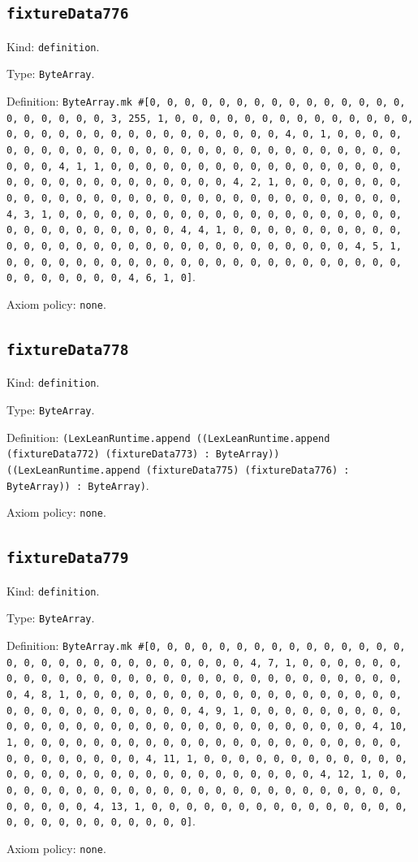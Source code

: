 \documentclass[11pt]{article}
\begin{document}
\subsection*{\texttt{fixtureData776}}
\noindent Kind: \texttt{definition}.\par
\noindent Type: \texttt{ByteArray}.\par
\noindent Definition: \texttt{ByteArray.mk \#[0, 0, 0, 0, 0, 0, 0, 0, 0, 0, 0, 0, 0, 0, 0, 0, 0, 0, 0, 0, 0, 3, 255, 1, 0, 0, 0, 0, 0, 0, 0, 0, 0, 0, 0, 0, 0, 0, 0, 0, 0, 0, 0, 0, 0, 0, 0, 0, 0, 0, 0, 0, 0, 0, 4, 0, 1, 0, 0, 0, 0, 0, 0, 0, 0, 0, 0, 0, 0, 0, 0, 0, 0, 0, 0, 0, 0, 0, 0, 0, 0, 0, 0, 0, 0, 0, 0, 4, 1, 1, 0, 0, 0, 0, 0, 0, 0, 0, 0, 0, 0, 0, 0, 0, 0, 0, 0, 0, 0, 0, 0, 0, 0, 0, 0, 0, 0, 0, 0, 0, 4, 2, 1, 0, 0, 0, 0, 0, 0, 0, 0, 0, 0, 0, 0, 0, 0, 0, 0, 0, 0, 0, 0, 0, 0, 0, 0, 0, 0, 0, 0, 0, 0, 4, 3, 1, 0, 0, 0, 0, 0, 0, 0, 0, 0, 0, 0, 0, 0, 0, 0, 0, 0, 0, 0, 0, 0, 0, 0, 0, 0, 0, 0, 0, 0, 0, 4, 4, 1, 0, 0, 0, 0, 0, 0, 0, 0, 0, 0, 0, 0, 0, 0, 0, 0, 0, 0, 0, 0, 0, 0, 0, 0, 0, 0, 0, 0, 0, 0, 4, 5, 1, 0, 0, 0, 0, 0, 0, 0, 0, 0, 0, 0, 0, 0, 0, 0, 0, 0, 0, 0, 0, 0, 0, 0, 0, 0, 0, 0, 0, 0, 0, 4, 6, 1, 0]}.\par
\noindent Axiom policy: \texttt{none}.\par
\subsection*{\texttt{fixtureData778}}
\noindent Kind: \texttt{definition}.\par
\noindent Type: \texttt{ByteArray}.\par
\noindent Definition: \texttt{(LexLeanRuntime.append ((LexLeanRuntime.append (fixtureData772) (fixtureData773) : ByteArray)) ((LexLeanRuntime.append (fixtureData775) (fixtureData776) : ByteArray)) : ByteArray)}.\par
\noindent Axiom policy: \texttt{none}.\par
\subsection*{\texttt{fixtureData779}}
\noindent Kind: \texttt{definition}.\par
\noindent Type: \texttt{ByteArray}.\par
\noindent Definition: \texttt{ByteArray.mk \#[0, 0, 0, 0, 0, 0, 0, 0, 0, 0, 0, 0, 0, 0, 0, 0, 0, 0, 0, 0, 0, 0, 0, 0, 0, 0, 0, 0, 0, 4, 7, 1, 0, 0, 0, 0, 0, 0, 0, 0, 0, 0, 0, 0, 0, 0, 0, 0, 0, 0, 0, 0, 0, 0, 0, 0, 0, 0, 0, 0, 0, 0, 4, 8, 1, 0, 0, 0, 0, 0, 0, 0, 0, 0, 0, 0, 0, 0, 0, 0, 0, 0, 0, 0, 0, 0, 0, 0, 0, 0, 0, 0, 0, 0, 0, 4, 9, 1, 0, 0, 0, 0, 0, 0, 0, 0, 0, 0, 0, 0, 0, 0, 0, 0, 0, 0, 0, 0, 0, 0, 0, 0, 0, 0, 0, 0, 0, 0, 4, 10, 1, 0, 0, 0, 0, 0, 0, 0, 0, 0, 0, 0, 0, 0, 0, 0, 0, 0, 0, 0, 0, 0, 0, 0, 0, 0, 0, 0, 0, 0, 0, 4, 11, 1, 0, 0, 0, 0, 0, 0, 0, 0, 0, 0, 0, 0, 0, 0, 0, 0, 0, 0, 0, 0, 0, 0, 0, 0, 0, 0, 0, 0, 0, 0, 4, 12, 1, 0, 0, 0, 0, 0, 0, 0, 0, 0, 0, 0, 0, 0, 0, 0, 0, 0, 0, 0, 0, 0, 0, 0, 0, 0, 0, 0, 0, 0, 0, 4, 13, 1, 0, 0, 0, 0, 0, 0, 0, 0, 0, 0, 0, 0, 0, 0, 0, 0, 0, 0, 0, 0, 0, 0, 0, 0, 0, 0]}.\par
\noindent Axiom policy: \texttt{none}.\par
\end{document}
